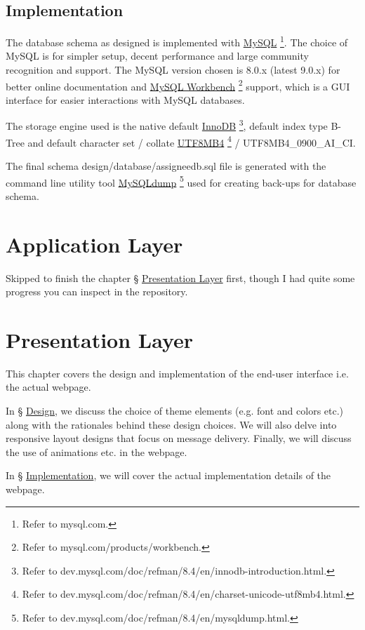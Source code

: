 \documentclass[12pt]{report}
\newcommand{\n}{\par}
\newcommand{\br}{\n\vspace{1 em}\n}
\begin{document}
\section{Implementation} \label{data-layer.implementation}
The database schema as designed is implemented with \href{https://www.mysql.com}{MySQL}
\footnote{Refer to mysql.com.}.
The choice of MySQL is for simpler setup, decent performance and large community recognition and support.
The MySQL version chosen is 8.0.x (latest 9.0.x) for better online documentation and
\href{https://www.mysql.com/products/workbench}{MySQL Workbench} \footnote{Refer to mysql.com/products/workbench.}
support, which is a GUI interface for easier interactions with MySQL databases.\n
The storage engine used is the native default \href{https://dev.mysql.com/doc/refman/8.4/en/innodb-introduction.html}{InnoDB}
\footnote{Refer to dev.mysql.com/doc/refman/8.4/en/innodb-introduction.html.},
default index type B-Tree and
default character set / collate
\href{https://dev.mysql.com/doc/refman/8.4/en/charset-unicode-utf8mb4.html}{UTF8MB4}
\footnote{Refer to dev.mysql.com/doc/refman/8.4/en/charset-unicode-utf8mb4.html.}
/ UTF8MB4\_0900\_AI\_CI.\n
The final schema design/database/assigneedb.sql file is generated with the command line utility tool
\href{https://dev.mysql.com/doc/refman/8.4/en/mysqldump.html}{MySQLdump}
\footnote{Refer to dev.mysql.com/doc/refman/8.4/en/mysqldump.html.}
used for creating back-ups for database schema.



\chapter{Application Layer} \label{application-layer}
Skipped to finish the chapter \S{} \hyperref[presentation-layer]{Presentation Layer} first, though I had quite some progress you can inspect in the repository.

\chapter{Presentation Layer} \label{presentation-layer}
This chapter covers the design and implementation of the end-user interface i.e. the actual webpage.
\br
In \S{} \hyperref[presentation-layer.design]{Design},
we discuss the choice of theme elements (e.g. font and colors etc.) along with the rationales behind these design choices.
We will also delve into responsive layout designs that focus on message delivery.
Finally, we will discuss the use of animations etc. in the webpage.\n
In \S{} \hyperref[presentation-layer.implementation]{Implementation},
we will cover the actual implementation details of the webpage.
\end{document}
